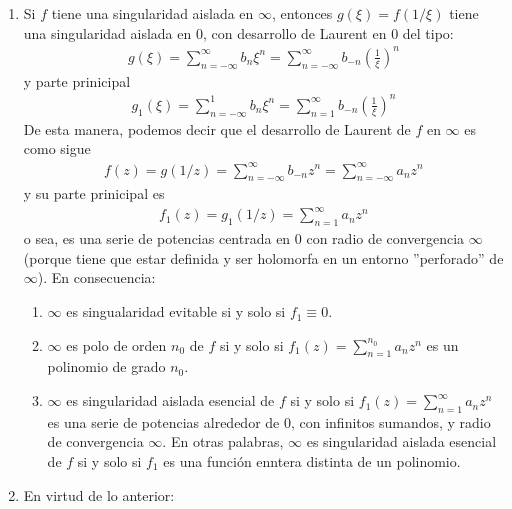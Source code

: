 \begin{obs}
    \begin{enumerate}
        \item Si $f$ tiene una singularidad aislada en $\infty$, entonces $g(\xi) = f(1/\xi)$ tiene una singularidad aislada en $0$, con desarrollo de Laurent en $0$ del tipo:
              \begin{align*}
                  g(\xi) = \sum_{n=-\infty}^{\infty}{b_n \xi^n} = \sum_{n=-\infty}^{\infty}{b_{-n} \left(\frac{1}{\xi}\right)^n}
              \end{align*}
              y parte prinicipal
              \begin{align*}
                  g_1(\xi) = \sum_{n=-\infty}^{1}{b_n \xi^n} = \sum_{n=1}^{\infty}{b_{-n} \left(\frac{1}{\xi}\right)^n}
              \end{align*}
              De esta manera, podemos decir que el desarrollo de Laurent de $f$ en $\infty$ es como sigue
              \begin{align*}
                  f(z) = g(1/z) = \sum_{n=-\infty}^{\infty}{b_{-n}z^n} = \sum_{n=-\infty}^{\infty}{a_nz^n}
              \end{align*}
              y su parte prinicipal es
              \begin{align*}
                  f_1(z) = g_1(1/z) = \sum_{n=1}^{\infty}{a_nz^n}
              \end{align*}
              o sea, es una serie de potencias centrada en 0 con radio de convergencia $\infty$ (porque tiene que estar definida y ser holomorfa en un entorno ''perforado'' de $\infty$). En consecuencia:
              \begin{enumerate}
                  \item $\infty$ es singualaridad evitable si y solo si $f_1 \equiv 0$.
                  \item $\infty$ es polo de orden $n_0$ de $f$ si y solo si $f_1(z) = \sum_{n=1}^{n_0}{a_nz^n}$ es un polinomio de grado $n_0$.
                  \item $\infty$ es singularidad aislada esencial de $f$ si y solo si $f_1(z) = \sum_{n=1}^{\infty}{a_nz^n}$ es una serie de potencias alrededor de 0, con infinitos sumandos, y radio de convergencia $\infty$. En otras palabras, $\infty$ es singularidad aislada esencial de $f$ si y solo si $f_1$ es una función enntera distinta de un polinomio.
              \end{enumerate}
        \item En virtud de lo anterior:

\end{enumerate}
\end{obs}
